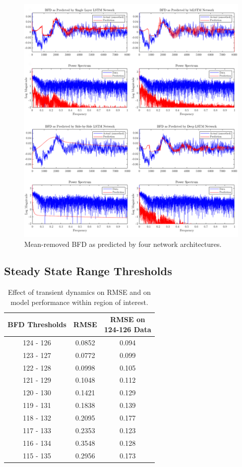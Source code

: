 \begin{figure}[ht!]
    \centering
    \includegraphics[width=\textwidth]{figures/combine_images.png}
    \caption{Mean-removed BFD as predicted by four network architectures.}
    \label{fig:prediction}
\end{figure}

\subsection{Steady State Range Thresholds}

\begin{table}[ht!]
    \centering
        \begin{tabular}{|c|c|c|}
            \hline
            BFD Thresholds & RMSE & \makecell{RMSE on \\ 124-126 Data} \\ \hline
            124 - 126 & 0.0852 & 0.094\\
            123 - 127 & 0.0772 & 0.099\\
            122 - 128 & 0.0998 & 0.105\\
            121 - 129 & 0.1048 & 0.112\\
            120 - 130 & 0.1421 & 0.129\\
            119 - 131 & 0.1838 & 0.139\\
            118 - 132 & 0.2095 & 0.177\\
            117 - 133 & 0.2353 & 0.123\\
            116 - 134 & 0.3548 & 0.128\\
            115 - 135 & 0.2956 & 0.173\\ \hline
        \end{tabular}
        \caption{Effect of transient dynamics on RMSE and on model performance within region of interest.}
        \label{tab:thresholds}
\end{table}

